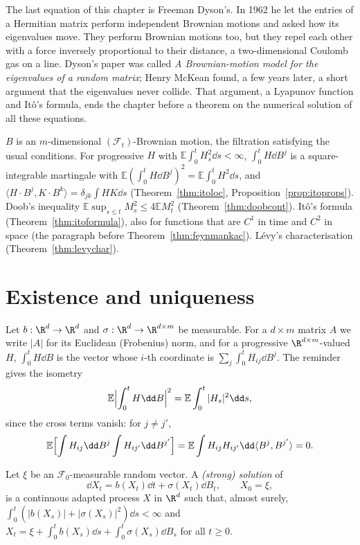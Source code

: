 The last equation of this chapter is Freeman Dyson's. In 1962 he let the entries of a Hermitian matrix perform independent Brownian motions and asked how its eigenvalues move. They perform Brownian
motions too, but they repel each other with a force inversely proportional to their distance, a two-dimensional Coulomb gas on a line. Dyson's paper was called \emph{A Brownian-motion model for the
eigenvalues of a random matrix}; Henry McKean found, a few years later, a short argument that the eigenvalues never collide. That argument, a Lyapunov function and It\^o's formula, ends the chapter
before a theorem on the numerical solution of all these equations.

\begin{reminder}
$B$ is an $m$-dimensional $(\mathcal F_t)$-Brownian motion, the filtration satisfying the usual conditions. For progressive $H$ with $\mathbb E\int_0^tH_s^2\dd s<\infty$, $\int_0^tH\dd B^j$ is a
square-integrable martingale with $\mathbb E(\int_0^tH\dd B^j)^2=\mathbb E\int_0^tH^2\dd s$, and $\langle H\cdot B^j,K\cdot B^k\rangle=\delta_{jk}\int HK\dd s$ (Theorem~\ref{thm:itoloc}, Proposition~\ref{prop:itoprops}). Doob's
inequality $\mathbb E\sup_{s\le t}M_s^2\le4\mathbb EM_t^2$ (Theorem~\ref{thm:doobcont}). It\^o's formula (Theorem~\ref{thm:itoformula}), also for functions that are $C^1$ in time and $C^2$ in space (the paragraph
before Theorem~\ref{thm:feynmankac}). L\'evy's characterisation (Theorem~\ref{thm:levychar}).
\end{reminder}

\section{Existence and uniqueness}

Let $b:\R^d\to\R^d$ and $\sigma:\R^d\to\R^{d\times m}$ be measurable. For a $d\times m$ matrix $A$ we write $|A|$ for its Euclidean (Frobenius) norm, and for a progressive $\R^{d\times m}$-valued $H$,
$\int_0^tH\dd B$ is the vector whose $i$-th coordinate is $\sum_j\int_0^tH_{ij}\dd B^j$. The reminder gives the isometry
\begin{equation}\label{eq:isomvec}
\mathbb E\Bigl|\int_0^tH\dd B\Bigr|^2=\mathbb E\int_0^t|H_s|^2\dd s ,
\end{equation}
since the cross terms vanish: for $j\ne j'$,
\[
\mathbb E\Bigl[\int H_{ij}\dd B^j\int H_{ij'}\dd B^{j'}\Bigr]=\mathbb E\int H_{ij}H_{ij'}\dd\langle B^j,B^{j'}\rangle=0.
\]

\begin{definition}\label{def:strongsol}
Let $\xi$ be an $\mathcal F_0$-measurable random vector. A \emph{(strong) solution} of
\[
\dd X_t=b(X_t)\dd t+\sigma(X_t)\dd B_t,\qquad X_0=\xi,
\]
is a continuous adapted process $X$ in $\R^d$ such that, almost surely, $\int_0^t(|b(X_s)|+|\sigma(X_s)|^2)\dd s<\infty$ and $X_t=\xi+\int_0^tb(X_s)\dd s+\int_0^t\sigma(X_s)\dd B_s$ for all $t\ge0$.
\end{definition}


